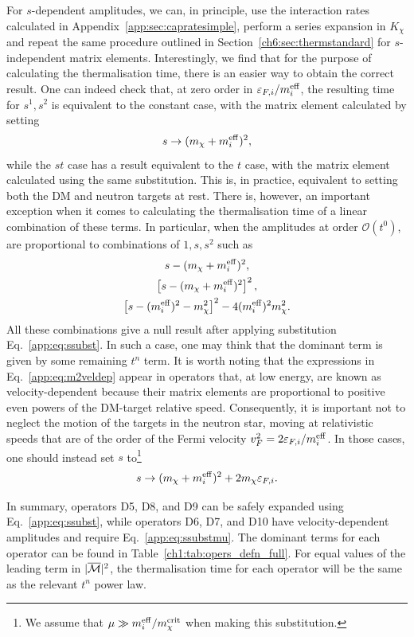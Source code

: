  For $s$-dependent amplitudes, we can, in principle, use the interaction rates calculated in Appendix~\ref{app:sec:capratesimple}, perform a series expansion in $K_\chi$  and repeat the same procedure outlined in Section~\ref{ch6:sec:thermstandard} for $s$-independent matrix elements. Interestingly, we find that for the purpose of calculating the thermalisation time, there is an easier way to obtain the correct result. One can indeed check that, at zero order in $\varepsilon_{F,i}/m_i^{\rm eff}$, the resulting time for $s^1, s^2$ is equivalent to the constant case, with the matrix element calculated by setting 
\begin{equation}
    s\rightarrow (m_\chi+m_i^{\rm eff})^2,
    \label{app:eq:ssubst}
\end{equation}
while the $s t $ case has a result equivalent to the $t$ case, with the matrix element calculated using the same substitution. This is, in practice, equivalent to setting both the DM and neutron targets at rest. There is, however, an important exception when it comes to calculating the thermalisation time of a linear combination of these terms. In particular, when the amplitudes at order $\mathcal{O}(t^0)$, are proportional to combinations of $1,s,s^2$ such as
\begin{gather}
s-(m_\chi+m_i^{\rm eff})^2,\nonumber\\
\left[s-(m_\chi+m_i^{\rm eff})^2\right]^2,\nonumber\\
\left[s-(m_i^{\rm eff})^2-m_\chi^2\right]^2-4(m_i^{\rm eff})^2 m_\chi^2.\label{app:eq:m2veldep}
\end{gather}
All these combinations give a null result after applying substitution Eq.~\ref{app:eq:ssubst}. In such a case, one may think that the dominant term is given by some remaining $t^n$ term. It is worth noting that the expressions in  Eq.~\ref{app:eq:m2veldep}  appear in operators that, at low energy, are known as velocity-dependent because their matrix elements are proportional to positive even powers of the DM-target relative speed. Consequently, it is important not to neglect the motion of the targets in the neutron star, moving at relativistic speeds that are of the order of the Fermi velocity $v_F^2=2\varepsilon_{F,i}/m_i^{\rm eff}$. In those cases, one should instead set $s$ to\footnote{We assume that $\mu\gg m_i^{\rm eff}/m_\chi^{\rm crit}$ when making this substitution.}
\begin{equation}
    s\rightarrow (m_\chi+m_i^{\rm eff})^2+2m_\chi\varepsilon_{F,i}.
    \label{app:eq:ssubstmu}
\end{equation}


In summary, operators D5, D8, and D9 can be safely expanded using Eq.~\ref{app:eq:ssubst}, while operators D6, D7, and D10 have velocity-dependent amplitudes and require Eq.~\ref{app:eq:ssubstmu}. 
The dominant terms for each operator can be found in Table~\ref{ch1:tab:opers_defn_full}. 
For equal values of the leading term in $|\overline{\mathcal M}|^2$, the thermalisation time for each operator will be the same as the relevant $t^n$ power law. 


